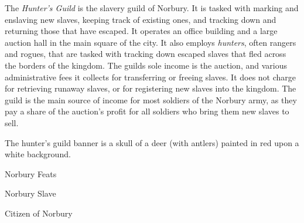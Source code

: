 The \emph{Hunter's Guild} is the slavery guild of Norbury. It is tasked with
marking and enslaving new slaves, keeping track of existing ones, and tracking
down and returning those that have escaped. It operates an office building and
a large auction hall in the main square of the city. It also employs
\emph{hunters}, often rangers and rogues, that are tasked with tracking down
escaped slaves that fled across the borders of the kingdom. The guilds sole
income is the auction, and various administrative fees it collects for
transferring or freeing slaves. It does not charge for retrieving runaway
slaves, or for registering new slaves into the kingdom. The guild is the main
source of income for most soldiers of the Norbury army, as they pay a share of
the auction's profit for all soldiers who bring them new slaves to sell.

The hunter's guild banner is a skull of a deer (with antlers) painted in red
upon a white background.

\begin{35efeats}{Norbury Feats}
  \begin{35efeat}{Norbury Slave}
    \srdheritagefeat
  \end{35efeat}
  \begin{35efeat}{Citizen of Norbury}
    \srdheritagefeat
  \end{35efeat}
\end{35efeats}
